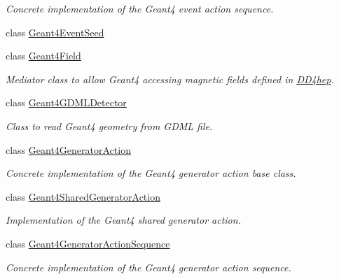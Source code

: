 \begin{DoxyCompactItemize}
\begin{DoxyCompactList}\small\item\em Concrete implementation of the Geant4 event action sequence. \item\end{DoxyCompactList}\item 
class \hyperlink{class_d_d4hep_1_1_simulation_1_1_geant4_event_seed}{Geant4EventSeed}
\item 
class \hyperlink{class_d_d4hep_1_1_simulation_1_1_geant4_field}{Geant4Field}
\begin{DoxyCompactList}\small\item\em Mediator class to allow Geant4 accessing magnetic fields defined in \hyperlink{namespace_d_d4hep}{DD4hep}. \item\end{DoxyCompactList}\item 
class \hyperlink{class_d_d4hep_1_1_simulation_1_1_geant4_g_d_m_l_detector}{Geant4GDMLDetector}
\begin{DoxyCompactList}\small\item\em Class to read Geant4 geometry from GDML file. \item\end{DoxyCompactList}\item 
class \hyperlink{class_d_d4hep_1_1_simulation_1_1_geant4_generator_action}{Geant4GeneratorAction}
\begin{DoxyCompactList}\small\item\em Concrete implementation of the Geant4 generator action base class. \item\end{DoxyCompactList}\item 
class \hyperlink{class_d_d4hep_1_1_simulation_1_1_geant4_shared_generator_action}{Geant4SharedGeneratorAction}
\begin{DoxyCompactList}\small\item\em Implementation of the Geant4 shared generator action. \item\end{DoxyCompactList}\item 
class \hyperlink{class_d_d4hep_1_1_simulation_1_1_geant4_generator_action_sequence}{Geant4GeneratorActionSequence}
\begin{DoxyCompactList}\small\item\em Concrete implementation of the Geant4 generator action sequence. \item\end{DoxyCompactList}\item 

\end{DoxyCompactItemize}
